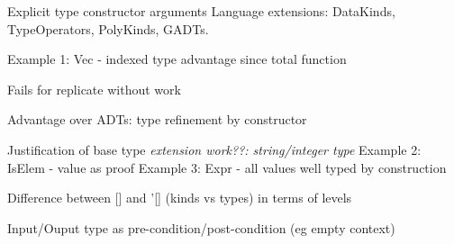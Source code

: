 \cite{GADTs}
Explicit type constructor arguments
Language extensions:
DataKinds, TypeOperators, PolyKinds, GADTs.

Example 1: Vec - indexed type advantage since total function

Fails for replicate without work \cite{DependentHaskell}

Advantage over ADTs: type refinement by constructor

Justification of base type \textit{extension work??: string/integer type}
Example 2: IsElem - value as proof
Example 3: Expr - all values well typed by construction

Difference between [] and '[] (kinds vs types) in terms of levels

Input/Ouput type as pre-condition/post-condition (eg empty context)
